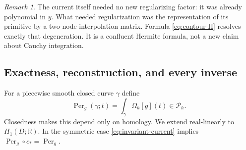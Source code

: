 \documentclass[11pt,a4paper]{article}
\numberwithin{equation}{section}
\theoremstyle{definition}
\theoremstyle{remark}
\newtheorem{remark}[theorem]{Remark}
\newcommand{\R}{\mathbb R}
\newcommand{\Pspace}{\mathscr P_h}
\newcommand{\Per}{\operatorname{Per}}
\begin{document}
\begin{remark}
The current itself needed no new regularizing factor: it was already
polynomial in $y$. What needed regularization was the representation of its
primitive by a two-node interpolation matrix. Formula \eqref{eq:contour-H}
resolves exactly that degeneration. It is a confluent Hermite formula, not
a new claim about Cauchy integration.
\end{remark}

\subsection{Exactness, reconstruction, and every inverse}

For a piecewise smooth closed curve $\gamma$ define
\begin{equation}\label{eq:period}
 \Per_g(\gamma;t)=\int_\gamma\Omega_h[g](t)\in\Pspace.
\end{equation}
Closedness makes this depend only on homology. We extend real-linearly to
$H_1(D;\R)$. In the symmetric case \eqref{eq:invariant-current} implies
$\Per_g\circ c_*=\Per_g$.
\end{document}
